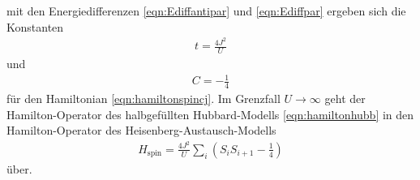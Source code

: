 mit den Energiedifferenzen \eqref{eqn:Ediffantipar} und \eqref{eqn:Ediffpar} ergeben sich die Konstanten
\begin{align}
  t = \frac{4 J^2}{U}
  \label{eqn:spint}
\end{align}
und
\begin{align}
  C = -\frac14
\end{align}
für den Hamiltonian \eqref{eqn:hamiltonspincj}.
Im Grenzfall $U \to \infty$ geht der Hamilton-Operator des halbgefüllten Hubbard-Modells \eqref{eqn:hamiltonhubb} in den Hamilton-Operator des Heisenberg-Austausch-Modells
\begin{align}
  H_\text{spin} = \frac{4 J^2}{U} \sum_{i} (S_i S_{i+1} - \frac14)
  \label{eqn:hamiltonspin1}
\end{align}
über.
